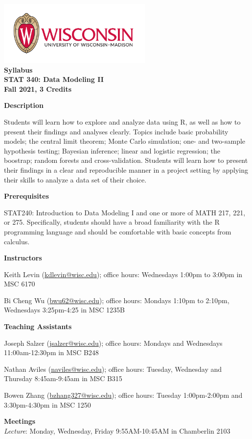 \documentclass[11pt,oneside]{amsart}
\newcommand{\header}[1]{\bigbreak\textbf{#1}}
\begin{document}
\begin{center}
  \bf
  \includegraphics[width=3in]{color-flush-UWlogo-print} \\
  Syllabus \\
  STAT 340: Data Modeling II \\
  Fall 2021, 3 Credits 
\end{center}

\header{Description}

Students will learn how to explore and analyze data using R, as well as how to present their findings and analyses clearly.
Topics include basic probability models; the central limit theorem; Monte Carlo simulation; one- and two-sample hypothesis testing; Bayesian inference; linear and logistic regression; the boostrap; random forests and cross-validation.
Students will learn how to present their findings in a clear and reproducible manner in a project setting by applying their skills to analyze a data set of their choice.

\header{Prerequisites}

STAT240: Introduction to Data Modeling I
and one or more of MATH 217, 221, or 275.
Specifically, students should have a broad familiarity with the R programming language and should be comfortable with basic concepts from calculus.

\header{Instructors}

Keith Levin (\url{kdlevin@wisc.edu}); office hours: Wednesdays 1:00pm to 3:00pm in MSC 6170

Bi Cheng Wu (\url{bwu62@wisc.edu}); office hours: Mondays 1:10pm to 2:10pm, Wednesdays 3:25pm-4:25 in MSC 1235B

\header{Teaching Assistants}

Joseph Salzer (\url{jsalzer@wisc.edu}); office hours: Mondays and Wednesdays 11:00am-12:30pm in MSC B248

Nathan Aviles (\url{naviles@wisc.edu}); office hours: Tuesday, Wednesday and Thursday 8:45am-9:45am in MSC B315

Bowen Zhang (\url{bzhang327@wisc.edu}); office hours: Tuesday 1:00pm-2:00pm and 3:30pm-4:30pm in MSC 1250

\header{Meetings}\\
{\em Lecture}: Monday, Wednesday, Friday 9:55AM-10:45AM in Chamberlin 2103
\end{document}
